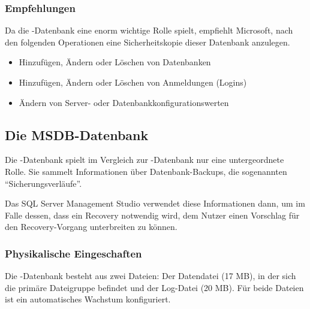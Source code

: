         \subsubsection{Empfehlungen}
          Da die -Datenbank eine enorm wichtige Rolle spielt,
          empfiehlt Microsoft, nach den folgenden Operationen eine
          Sicherheitskopie dieser Datenbank anzulegen.
          \begin{itemize}
            \item Hinzufügen, Ändern oder Löschen von Datenbanken
            \item Hinzufügen, Ändern oder Löschen von Anmeldungen (Logins)
            \item Ändern von Server- oder Datenbankkonfigurationswerten
          \end{itemize}
          \begin{literaturinternet}
            \item \cite{ms187837}
          \end{literaturinternet}          
      \subsection{Die MSDB-Datenbank}
        Die -Datenbank spielt im Vergleich zur
        -Datenbank nur eine untergeordnete Rolle. Sie sammelt
        Informationen über Datenbank-Backups, die sogenannten
        \enquote{Sicherungsverläufe}.
        
        Das SQL Server Management Studio verwendet diese Informationen dann, um
        im Falle dessen, dass ein Recovery notwendig wird, dem Nutzer einen
        Vorschlag für den Recovery-Vorgang unterbreiten zu können.
        \subsubsection{Physikalische Eingeschaften}
          Die -Datenbank besteht aus zwei Dateien: Der
          Datendatei  (17 MB), in der sich die
          primäre Dateigruppe befindet und der Log-Datei
           (20 MB). Für beide Dateien ist ein
          automatisches Wachstum konfiguriert.
